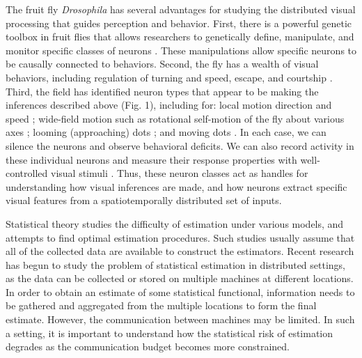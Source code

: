 The fruit fly \textit{Drosophila} has several advantages for studying the
distributed visual processing that guides perception and
behavior. First, there is a powerful genetic toolbox in fruit flies
that allows researchers to genetically define, manipulate, and monitor
specific classes of neurons \citep{luo:08}. These manipulations
allow specific neurons to be causally connected to
behaviors. Second, the fly has a wealth of visual behaviors,
including regulation of turning and speed, escape, and
courtship \citep{card:08,silies:14,spieth:74}.
Third, the field has identified neuron types that
appear to be making the inferences described above (Fig. 1), including for: 
local motion direction and speed \citep{Maisak:13};
wide-field motion such as rotational
self-motion of the fly about various axes \citep{joesch:08};
looming (approaching) 
dots \citep{devries:12,klapoetke:17}; and 
moving dots \citep{keles:17}. In each case, we
can silence the neurons and observe behavioral deficits. We can also
record activity in these individual neurons and measure their
response properties with well-controlled visual stimuli
\citep{salazar:16}. Thus, these neuron classes act as
handles for understanding how visual inferences are made, and how
neurons extract specific visual features from a spatiotemporally
distributed set of inputs.


\statbackground{}
Statistical theory studies the difficulty of estimation under
various models, and attempts to find optimal estimation
procedures. Such studies usually assume that all of the collected
data are available to construct the estimators. Recent research
has begun to study the problem of statistical estimation in distributed settings, 
as the data can be collected or
stored on multiple machines at different locations. In order to obtain an estimate of some
statistical functional, information needs to be gathered and
aggregated from the multiple locations to form the final
estimate. However, the communication between machines may be
limited. In such a setting, it is important to understand how the
statistical risk of estimation degrades as the communication budget
becomes more constrained.

